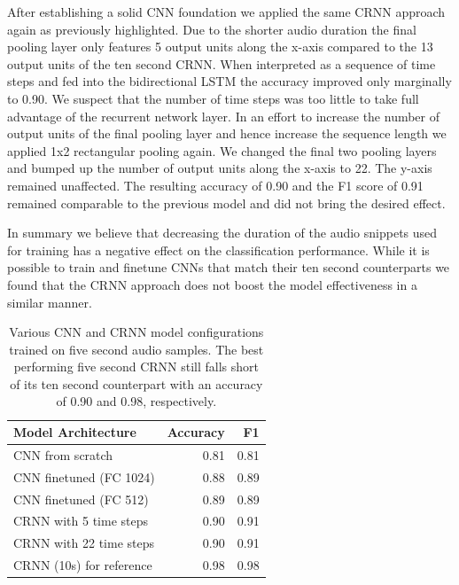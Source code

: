 After establishing a solid CNN foundation we applied the same CRNN approach again as previously highlighted. Due to the shorter audio duration the final pooling layer only features 5 output units along the x-axis compared to the 13 output units of the ten second CRNN. When interpreted as a sequence of time steps and fed into the bidirectional LSTM the accuracy improved only marginally to 0.90. We suspect that the number of time steps was too little to take full advantage of the recurrent network layer.
In an effort to increase the number of output units of the final pooling layer and hence increase the sequence length we applied 1x2 rectangular pooling again. We changed the final two pooling layers and bumped up the number of output units along the x-axis to 22. The y-axis remained unaffected. The resulting accuracy of 0.90 and the F1 score of 0.91 remained comparable to the previous model and did not bring the desired effect. 

In summary we believe that decreasing the duration of the audio snippets used for training has a negative effect on the classification performance. While it is possible to train and finetune CNNs that match their ten second counterparts we found that the CRNN approach does not boost the model effectiveness in a similar manner.
	
	\begin{table}[]
	\centering
	\begin{tabularx}{\textwidth}{lrr}
	\toprule
	Model Architecture		& Accuracy 		& F1 	\\ \midrule
	CNN from scratch    		& 0.81			& 0.81 	\\
	CNN finetuned (FC 1024)	& 0.88			& 0.89 	\\
	CNN finetuned (FC 512)	& 0.89			& 0.89 	\\
	CRNN with 5 time steps	& 0.90			& 0.91 	\\
	CRNN with 22 time steps & 0.90			& 0.91 	\\ \midrule
	CRNN (10s) for reference& 0.98			& 0.98 	\\ 
 	\bottomrule
	\end{tabularx}
	\caption{Various CNN and CRNN model configurations trained on five second audio samples. The best performing five second CRNN still falls short of its ten second counterpart with an accuracy of 0.90 and 0.98, respectively.}
	\label{tab:audio_duration}
	\end{table}


